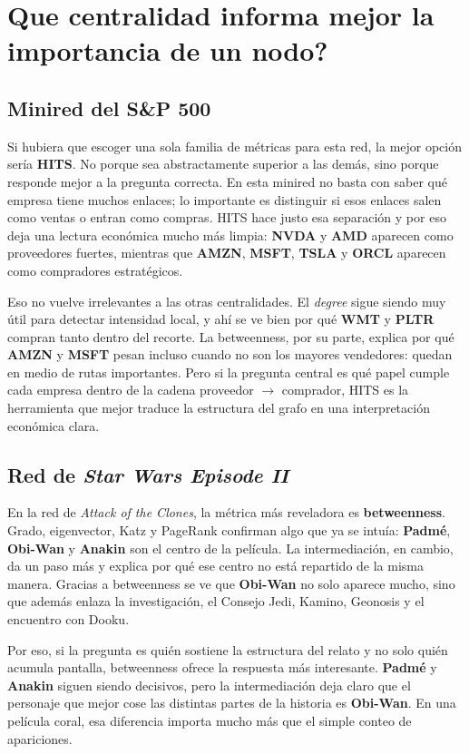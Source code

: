 \section{Que centralidad informa mejor la importancia de un nodo?}

\subsection{Minired del S\&P 500}

Si hubiera que escoger una sola familia de m\'etricas para esta red, la mejor opci\'on ser\'ia \textbf{HITS}. No porque sea abstractamente superior a las dem\'as, sino porque responde mejor a la pregunta correcta. En esta minired no basta con saber qu\'e empresa tiene muchos enlaces; lo importante es distinguir si esos enlaces salen como ventas o entran como compras. HITS hace justo esa separaci\'on y por eso deja una lectura econ\'omica mucho m\'as limpia: \textbf{NVDA} y \textbf{AMD} aparecen como proveedores fuertes, mientras que \textbf{AMZN}, \textbf{MSFT}, \textbf{TSLA} y \textbf{ORCL} aparecen como compradores estrat\'egicos.

Eso no vuelve irrelevantes a las otras centralidades. El \textit{degree} sigue siendo muy \'util para detectar intensidad local, y ah\'i se ve bien por qu\'e \textbf{WMT} y \textbf{PLTR} compran tanto dentro del recorte. La betweenness, por su parte, explica por qu\'e \textbf{AMZN} y \textbf{MSFT} pesan incluso cuando no son los mayores vendedores: quedan en medio de rutas importantes. Pero si la pregunta central es qu\'e papel cumple cada empresa dentro de la cadena proveedor $\to$ comprador, HITS es la herramienta que mejor traduce la estructura del grafo en una interpretaci\'on econ\'omica clara.

\subsection{Red de \textit{Star Wars Episode II}}

En la red de \textit{Attack of the Clones}, la m\'etrica m\'as reveladora es \textbf{betweenness}. Grado, eigenvector, Katz y PageRank confirman algo que ya se intu\'ia: \textbf{Padm\'e}, \textbf{Obi-Wan} y \textbf{Anakin} son el centro de la pel\'icula. La intermediaci\'on, en cambio, da un paso m\'as y explica por qu\'e ese centro no est\'a repartido de la misma manera. Gracias a betweenness se ve que \textbf{Obi-Wan} no solo aparece mucho, sino que adem\'as enlaza la investigaci\'on, el Consejo Jedi, Kamino, Geonosis y el encuentro con Dooku.

Por eso, si la pregunta es qui\'en sostiene la estructura del relato y no solo qui\'en acumula pantalla, betweenness ofrece la respuesta m\'as interesante. \textbf{Padm\'e} y \textbf{Anakin} siguen siendo decisivos, pero la intermediaci\'on deja claro que el personaje que mejor cose las distintas partes de la historia es \textbf{Obi-Wan}. En una pel\'icula coral, esa diferencia importa mucho m\'as que el simple conteo de apariciones.
